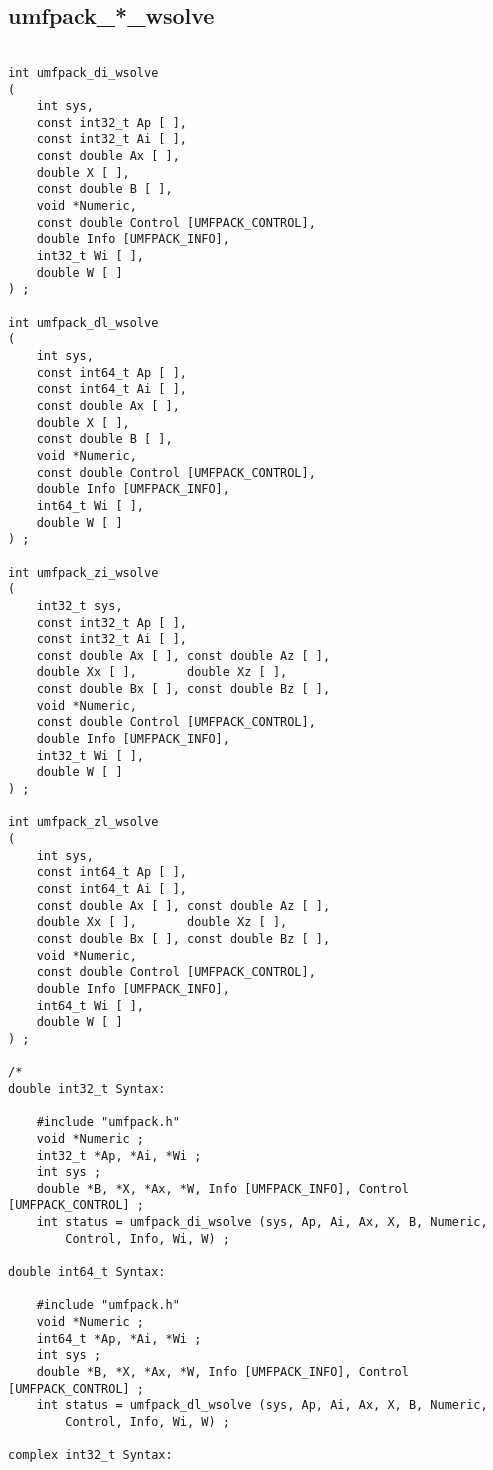 \documentclass[11pt]{article}
\begin{document}
\newpage
\subsection{umfpack\_*\_wsolve}

{\footnotesize
\begin{verbatim}

int umfpack_di_wsolve
(
    int sys,
    const int32_t Ap [ ],
    const int32_t Ai [ ],
    const double Ax [ ],
    double X [ ],
    const double B [ ],
    void *Numeric,
    const double Control [UMFPACK_CONTROL],
    double Info [UMFPACK_INFO],
    int32_t Wi [ ],
    double W [ ]
) ;

int umfpack_dl_wsolve
(
    int sys,
    const int64_t Ap [ ],
    const int64_t Ai [ ],
    const double Ax [ ],
    double X [ ],
    const double B [ ],
    void *Numeric,
    const double Control [UMFPACK_CONTROL],
    double Info [UMFPACK_INFO],
    int64_t Wi [ ],
    double W [ ]
) ;

int umfpack_zi_wsolve
(
    int32_t sys,
    const int32_t Ap [ ],
    const int32_t Ai [ ],
    const double Ax [ ], const double Az [ ],
    double Xx [ ],       double Xz [ ],
    const double Bx [ ], const double Bz [ ],
    void *Numeric,
    const double Control [UMFPACK_CONTROL],
    double Info [UMFPACK_INFO],
    int32_t Wi [ ],
    double W [ ]
) ;

int umfpack_zl_wsolve
(
    int sys,
    const int64_t Ap [ ],
    const int64_t Ai [ ],
    const double Ax [ ], const double Az [ ],
    double Xx [ ],       double Xz [ ],
    const double Bx [ ], const double Bz [ ],
    void *Numeric,
    const double Control [UMFPACK_CONTROL],
    double Info [UMFPACK_INFO],
    int64_t Wi [ ],
    double W [ ]
) ;

/*
double int32_t Syntax:

    #include "umfpack.h"
    void *Numeric ;
    int32_t *Ap, *Ai, *Wi ;
    int sys ;
    double *B, *X, *Ax, *W, Info [UMFPACK_INFO], Control [UMFPACK_CONTROL] ;
    int status = umfpack_di_wsolve (sys, Ap, Ai, Ax, X, B, Numeric,
        Control, Info, Wi, W) ;

double int64_t Syntax:

    #include "umfpack.h"
    void *Numeric ;
    int64_t *Ap, *Ai, *Wi ;
    int sys ;
    double *B, *X, *Ax, *W, Info [UMFPACK_INFO], Control [UMFPACK_CONTROL] ;
    int status = umfpack_dl_wsolve (sys, Ap, Ai, Ax, X, B, Numeric,
        Control, Info, Wi, W) ;

complex int32_t Syntax:


\end{verbatim}}
\end{document}
